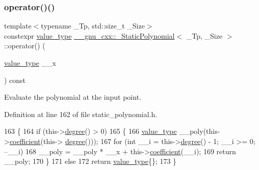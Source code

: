 \subsubsection{\texorpdfstring{operator()()}{operator()()}\hspace{0.1cm}{\footnotesize\ttfamily [1/4]}}
{\footnotesize\ttfamily template$<$typename \+\_\+\+Tp, std\+::size\+\_\+t \+\_\+\+Size$>$ \\
constexpr \hyperlink{class____gnu__cxx_1_1__StaticPolynomial_aad5f3d6d5876b6926b30724aeac649d6}{value\+\_\+type} \hyperlink{class____gnu__cxx_1_1__StaticPolynomial}{\+\_\+\+\_\+gnu\+\_\+cxx\+::\+\_\+\+Static\+Polynomial}$<$ \+\_\+\+Tp, \+\_\+\+Size $>$\+::operator() (\begin{DoxyParamCaption}\item[{\hyperlink{class____gnu__cxx_1_1__StaticPolynomial_aad5f3d6d5876b6926b30724aeac649d6}{value\+\_\+type}}]{\+\_\+\+\_\+x }\end{DoxyParamCaption}) const\hspace{0.3cm}{\ttfamily [inline]}}

Evaluate the polynomial at the input point. 

Definition at line 162 of file static\+\_\+polynomial.\+h.


\begin{DoxyCode}
163       \{
164         \textcolor{keywordflow}{if} (this->\hyperlink{class____gnu__cxx_1_1__StaticPolynomial_a5977dac3a84e8a43f3e9da28b62ca46a}{degree}() > 0)
165           \{
166             \hyperlink{class____gnu__cxx_1_1__StaticPolynomial_aad5f3d6d5876b6926b30724aeac649d6}{value\_type} \_\_poly(this->\hyperlink{class____gnu__cxx_1_1__StaticPolynomial_a74535a3f8f586223097b30891bc1402b}{coefficient}(this->
      \hyperlink{class____gnu__cxx_1_1__StaticPolynomial_a5977dac3a84e8a43f3e9da28b62ca46a}{degree}()));
167             \textcolor{keywordflow}{for} (\textcolor{keywordtype}{int} \_\_i = this->\hyperlink{class____gnu__cxx_1_1__StaticPolynomial_a5977dac3a84e8a43f3e9da28b62ca46a}{degree}() - 1; \_\_i >= 0; --\_\_i)
168               \_\_poly = \_\_poly * \_\_x + this->\hyperlink{class____gnu__cxx_1_1__StaticPolynomial_a74535a3f8f586223097b30891bc1402b}{coefficient}(\_\_i);
169             \textcolor{keywordflow}{return} \_\_poly;
170           \}
171         \textcolor{keywordflow}{else}
172           \textcolor{keywordflow}{return} \hyperlink{class____gnu__cxx_1_1__StaticPolynomial_aad5f3d6d5876b6926b30724aeac649d6}{value\_type}\{\};
173       \}
\end{DoxyCode}
\mbox{\label{class____gnu__cxx_1_1__StaticPolynomial_a8e325d80a173e9a39d6493797550947f}} 
